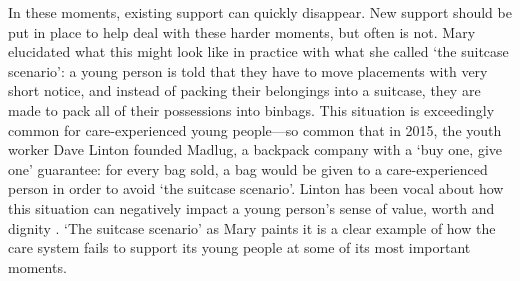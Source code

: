 In these moments, existing support can quickly disappear. New support should be put in place to help deal with these harder moments, but often is not. Mary elucidated what this might look like in practice with what she called `the suitcase scenario': a young person is told that they have to move placements with very short notice, and instead of packing their belongings into a suitcase, they are made to pack all of their  possessions into binbags. This situation is exceedingly common for care-experienced young people—so common that in 2015, the youth worker Dave Linton founded Madlug, a backpack company with a ‘buy one, give one’ guarantee: for every bag sold, a bag would be given to a care-experienced person in order to avoid ‘the suitcase scenario’. Linton has been vocal about how this situation can negatively impact a young person's sense of value, worth and dignity \citep{madlug_madlug_2021}. `The suitcase scenario' as Mary paints it is a clear example of how the care system fails to support its young people at some of its most important moments.

